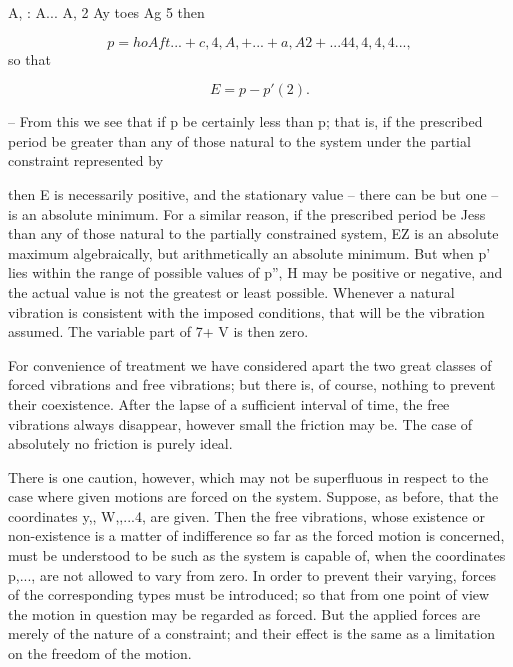 A, : A... A, 2 Ay toes Ag 5 then

\[p= {ho Aft... +c,4,A,+...} + {a,A2+...44,4,4,4...},\]
so that

\[E= p -p'  (2).\]

-- From this we see that if p be certainly less than p; that is, if the
prescribed period be greater than any of those natural to the system under
the partial constraint represented by

then E is necessarily positive, and the stationary value -- there can be but one
-- is an absolute minimum. For a similar reason, if the prescribed period be
Jess than any of those natural to the partially constrained system, EZ is an
absolute maximum algebraically, but arithmetically an absolute minimum. But
when p' lies within the range of possible values of p'', H may be positive or
negative, and the actual value is not the greatest or least possible. Whenever
a natural vibration is consistent with the imposed conditions, that will be the
vibration assumed. The variable part of 7+ V is then zero.

For convenience of treatment we have considered apart the two great classes of
forced vibrations and free vibrations; but there is, of course, nothing to
prevent their coexistence. After the lapse of a sufficient interval of time,
the free vibrations always disappear, however small the friction may be. The
case of absolutely no friction is purely ideal.

There is one caution, however, which may not be superfluous in respect to the
case where given motions are forced on the system. Suppose, as before, that the
coordinates y,, W,,...4, are given.  Then the free vibrations, whose existence
or non-existence is a matter of indifference so far as the forced motion is
concerned, must be understood to be such as the system is capable of, when the
coordinates p,..., are not allowed to vary from zero. In order to prevent their
varying, forces of the corresponding types must be introduced; so that from one
point of view the motion in question may be regarded as forced.  But the
applied forces are merely of the nature of a constraint; and their effect is
the same as a limitation on the freedom of the motion.

